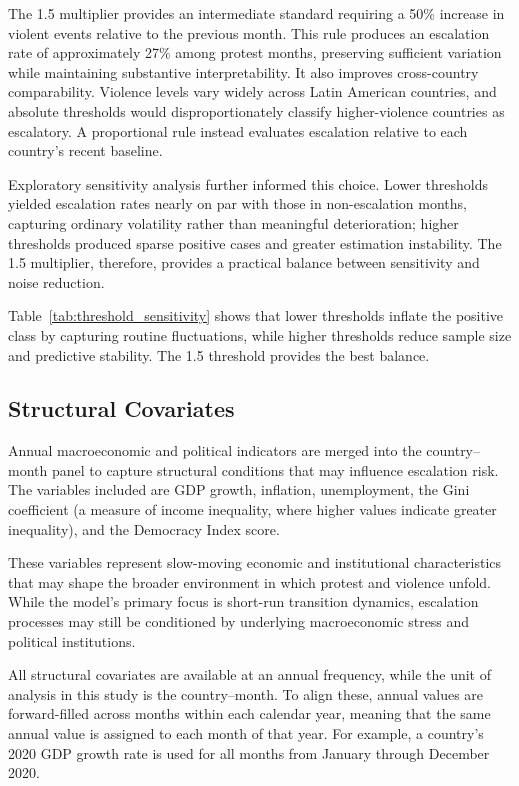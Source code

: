 \documentclass[12pt]{article}
\begin{document}
The 1.5 multiplier provides an intermediate standard requiring a 50\% increase in violent events relative to the previous month. This rule produces an escalation rate of approximately 27\% among protest months, preserving sufficient variation while maintaining substantive interpretability. It also improves cross-country comparability. Violence levels vary widely across Latin American countries, and absolute thresholds would disproportionately classify higher-violence countries as escalatory. A proportional rule instead evaluates escalation relative to each country’s recent baseline.

Exploratory sensitivity analysis further informed this choice. Lower thresholds yielded escalation rates nearly on par with those in non-escalation months, capturing ordinary volatility rather than meaningful deterioration; higher thresholds produced sparse positive cases and greater estimation instability. The 1.5 multiplier, therefore, provides a practical balance between sensitivity and noise reduction.

Table~\ref{tab:threshold_sensitivity} shows that lower thresholds inflate the positive class by capturing routine fluctuations, while higher thresholds reduce sample size and predictive stability. The 1.5 threshold provides the best balance.

\subsection{Structural Covariates}

Annual macroeconomic and political indicators are merged into the country--month panel to capture structural conditions that may influence escalation risk. The variables included are GDP growth, inflation, unemployment, the Gini coefficient (a measure of income inequality, where higher values indicate greater inequality), and the Democracy Index score.

These variables represent slow-moving economic and institutional characteristics that may shape the broader environment in which protest and violence unfold. While the model's primary focus is short-run transition dynamics, escalation processes may still be conditioned by underlying macroeconomic stress and political institutions.

All structural covariates are available at an annual frequency, while the unit of analysis in this study is the country–month. To align these, annual values are forward-filled across months within each calendar year, meaning that the same annual value is assigned to each month of that year. For example, a country’s 2020 GDP growth rate is used for all months from January through December 2020.
\end{document}
